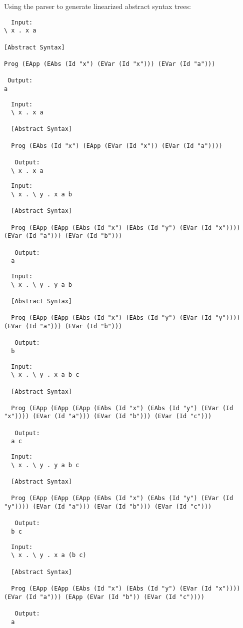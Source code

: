 \documentclass{article}
\theoremstyle{theorem}
\theoremstyle{definition}
\theoremstyle{remark}
\begin{document}
Using the parser to generate linearized abstract syntax trees:
\begin{lstlisting}
  Input:
\ x . x a

[Abstract Syntax]

Prog (EApp (EAbs (Id "x") (EVar (Id "x"))) (EVar (Id "a")))

 Output:
a 
\end{lstlisting}
\begin{lstlisting}
  Input:
  \ x . x a
  
  [Abstract Syntax]
  
  Prog (EAbs (Id "x") (EApp (EVar (Id "x")) (EVar (Id "a"))))
  
   Output:
  \ x . x a
\end{lstlisting}
\begin{lstlisting}
  Input:
  \ x . \ y . x a b
  
  [Abstract Syntax]
  
  Prog (EApp (EApp (EAbs (Id "x") (EAbs (Id "y") (EVar (Id "x")))) (EVar (Id "a"))) (EVar (Id "b")))
  
   Output:
  a
\end{lstlisting}
\begin{lstlisting}
  Input:
  \ x . \ y . y a b
  
  [Abstract Syntax]
  
  Prog (EApp (EApp (EAbs (Id "x") (EAbs (Id "y") (EVar (Id "y")))) (EVar (Id "a"))) (EVar (Id "b")))
  
   Output:
  b
\end{lstlisting}
\begin{lstlisting}
  Input:
  \ x . \ y . x a b c
  
  [Abstract Syntax]
  
  Prog (EApp (EApp (EApp (EAbs (Id "x") (EAbs (Id "y") (EVar (Id "x")))) (EVar (Id "a"))) (EVar (Id "b"))) (EVar (Id "c")))
  
   Output:
  a c
\end{lstlisting}
\begin{lstlisting}
  Input:
  \ x . \ y . y a b c
  
  [Abstract Syntax]
  
  Prog (EApp (EApp (EApp (EAbs (Id "x") (EAbs (Id "y") (EVar (Id "y")))) (EVar (Id "a"))) (EVar (Id "b"))) (EVar (Id "c")))
  
   Output:
  b c
\end{lstlisting}
\begin{lstlisting}
  Input:
  \ x . \ y . x a (b c)
  
  [Abstract Syntax]
  
  Prog (EApp (EApp (EAbs (Id "x") (EAbs (Id "y") (EVar (Id "x")))) (EVar (Id "a"))) (EApp (EVar (Id "b")) (EVar (Id "c"))))
  
   Output:
  a
\end{lstlisting}
\end{document}
